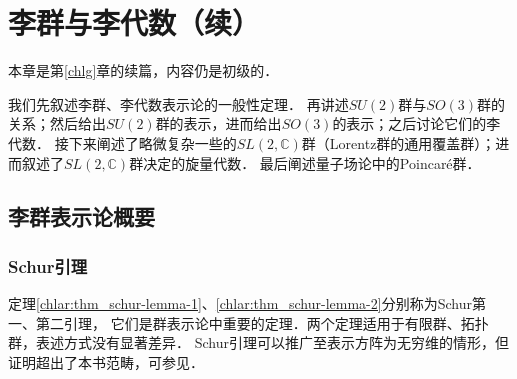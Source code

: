 

\chapter{李群与李代数（续）}\label{chlar}

本章是第\ref{chlg}章的续篇，内容仍是初级的．

我们先叙述李群、李代数表示论的一般性定理．
再讲述$SU(2)$群与$SO(3)$群的关系；然后给出$SU(2)$群的表示，进而给出$SO(3)$的表示；之后讨论它们的李代数．
接下来阐述了略微复杂一些的$SL(2,\mathbb{C})$群（Lorentz群的通用覆盖群）；进而叙述了$SL(2,\mathbb{C})$群决定的旋量代数．
最后阐述量子场论中的Poincar\'{e}群．


\section{李群表示论概要}\label{chlar:sec_lr}

  

\subsection{Schur引理}

定理\ref{chlar:thm_schur-lemma-1}、\ref{chlar:thm_schur-lemma-2}分别称为Schur第一、第二引理，
它们是群表示论中重要的定理．两个定理适用于有限群、拓扑群，表述方式没有显著差异．
Schur引理可以推广至表示方阵为无穷维的情形，但证明超出了本书范畴，可参见\parencite[\S 6.9.10]{qiuws-2011}．


